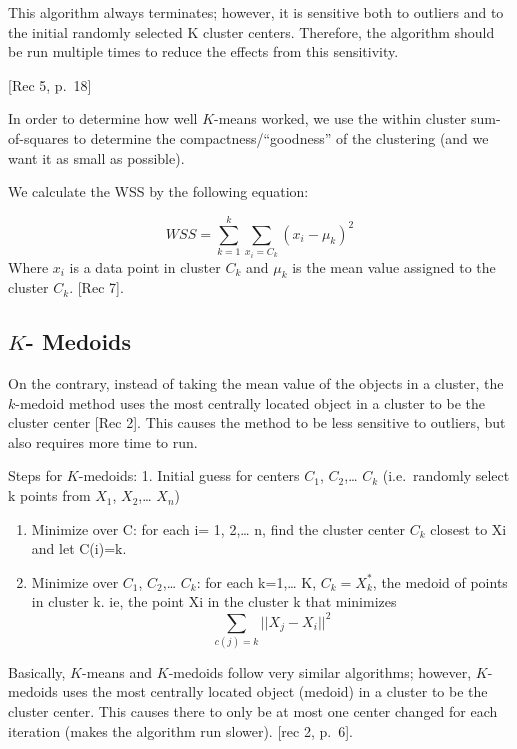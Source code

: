 \documentclass[12pt,twoside]{amherstthesis}
\begin{document}
  This algorithm always terminates; however, it is sensitive both to
  outliers and to the initial randomly selected K cluster centers.
  Therefore, the algorithm should be run multiple times to reduce the
  effects from this sensitivity.
  
  {[}Rec 5, p.~18{]}
  
  In order to determine how well \(K\)-means worked, we use the within
  cluster sum-of-squares to determine the compactness/``goodness'' of the
  clustering (and we want it as small as possible).
  
  We calculate the WSS by the following equation:
  
  \[WSS = \sum_{k=1}^k \sum_{x_i=C_k} ({{x_i- \mu_k}})^2\] Where \(x_i\)
  is a data point in cluster \(C_k\) and \(\mu_k\) is the mean value
  assigned to the cluster \(C_k\). {[}Rec 7{]}.
  
  \subsection{\texorpdfstring{\(K\)-
  Medoids}{K- Medoids}}\label{k--medoids}
  
  On the contrary, instead of taking the mean value of the objects in a
  cluster, the \(k\)-medoid method uses the most centrally located object
  in a cluster to be the cluster center {[}Rec 2{]}. This causes the
  method to be less sensitive to outliers, but also requires more time to
  run.
  
  Steps for \(K\)-medoids: 1. Initial guess for centers \(C_1\),
  \(C_2\),\ldots{} \(C_k\) (i.e.~randomly select k points from \(X_1\),
  \(X_2\),\ldots{} \(X_n\))
  
  \begin{enumerate}
  \def\labelenumi{\arabic{enumi}.}
  \setcounter{enumi}{1}
  \item
    Minimize over C: for each i= 1, 2,\ldots{} n, find the cluster center
    \(C_k\) closest to Xi and let C(i)=k.
  \item
    Minimize over \(C_1\), \(C_2\),\ldots{} \(C_k\): for each k=1,\ldots{}
    K, \(C_k = X_k^*\), the medoid of points in cluster k. ie, the point
    Xi in the cluster k that minimizes
    \[\sum  _{c(j)=k} ||{{X_j- X_i}}||^2\]
  \end{enumerate}
  
  Basically, \(K\)-means and \(K\)-medoids follow very similar algorithms;
  however, \(K\)-medoids uses the most centrally located object (medoid)
  in a cluster to be the cluster center. This causes there to only be at
  most one center changed for each iteration (makes the algorithm run
  slower). {[}rec 2, p.~6{]}.
  
\end{document}
